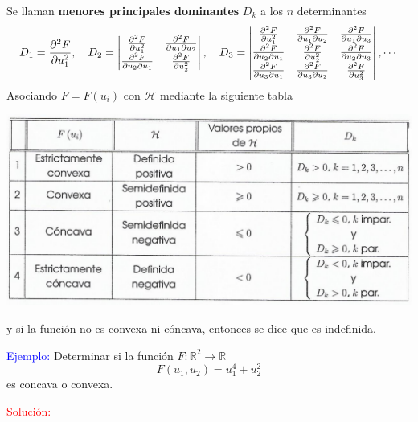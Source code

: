 \documentclass[../main]{subfiles}
\begin{document}
Se llaman \textbf{menores principales dominantes} $D_k$ a los $n$ determinantes
\begin{equation}
    D_1=\pdv{^2 F}{u^2_1},\quad D_2=
    \begin{vmatrix}
        \pdv{^2 F}{u^2_1} & \pdv{^2 F}{u_1 \partial u_2} \\
        \pdv{^2 F}{u_2 \partial u_1} & \pdv{^2 F}{u^2_2}
    \end{vmatrix}
    ,\quad D_3=
    \begin{vmatrix}
        \pdv{^2 F}{u^2_1} & \pdv{^2 F}{u_1 \partial u_2} & \pdv{^2 F}{u_1 \partial u_3} \\
        \pdv{^2 F}{u_2 \partial u_1} & \pdv{^2 F}{u^2_2} & \pdv{^2 F}{u_2 \partial u_3} \\
        \pdv{^2 F}{u_3 \partial u_1} & \pdv{^2 F}{u_3 \partial u_2} & \pdv{^2 F}{u^2_3}        
    \end{vmatrix}
    , \cdots
\end{equation}
Asociando $F=F(u_i)$ con $\mathcal{H}$ mediante la siguiente tabla
\begin{center}
    \includegraphics[scale=0.5]{figs/tabla.PNG}
\end{center}
y si la función no es convexa ni cóncava, entonces se dice que es indefinida.

\textcolor{blue}{Ejemplo:} Determinar si la función $F: \mathbb{R}^2\rightarrow \mathbb{R}$
\begin{equation*}
    F(u_1, u_2)=u^4_1+u^2_2
\end{equation*}
es concava o convexa.

\textcolor{red}{Solución:} 
\end{document}
